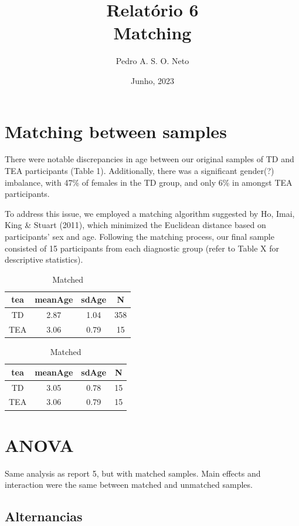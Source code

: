\documentclass{article}
\title{Relatório 6 \\ Matching}
\author{Pedro A. S. O. Neto}
\date{Junho, 2023}
\begin{document}
\maketitle

\section{Matching between samples}

There were notable discrepancies in age between our original samples of TD and TEA participants (Table 1). Additionally, there was a significant gender(?) imbalance, with 47\% of females in the TD group, and only 6\% in amongst TEA participants.

To address this issue, we employed a matching algorithm suggested by Ho, Imai, King \& Stuart (2011), which minimized the Euclidean distance based on participants' sex and age. Following the matching process, our final sample consisted of 15 participants from each diagnostic group (refer to Table X for descriptive statistics).

\begin{table}[H]
\parbox{.45\linewidth}{
\centering
\begin{tabular}{cccc}
\hline
    tea & meanAge & sdAge & N \\ 
    \hline
    TD & 2.87 & 1.04 & 358 \\ 
    TEA & 3.06 & 0.79 &  15 \\ 
\hline
\end{tabular}
\caption{Non matched}
}
\hfill
\parbox{.45\linewidth}{
\centering
\begin{tabular}{cccc}
\hline
   tea & meanAge & sdAge & N  \\ 
    \hline
    TD & 3.05 & 0.78 &  15 \\ 
    TEA & 3.06 & 0.79 & 15 \\ 
\hline
\end{tabular}
\caption{Matched}
}
\end{table}


\section{ANOVA}

Same analysis as report 5, but with matched samples. Main effects and interaction were the same between matched and unmatched samples.


\subsection{Alternancias}
\end{document}
